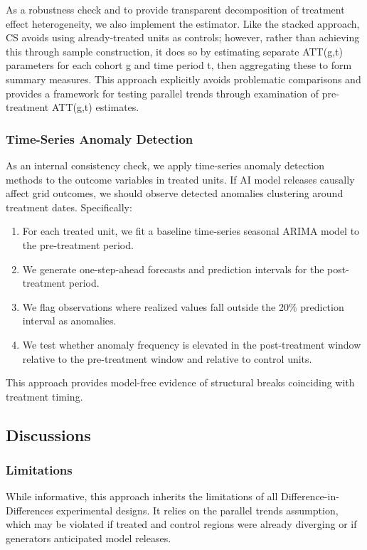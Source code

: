 \documentclass[a4paper,fleqn,longmktitle]{cas-sc}
\theoremstyle{plain}
\theoremstyle{definition}
\begin{document}
As a robustness check and to provide transparent decomposition of treatment effect heterogeneity, we also implement the \citet{callaway2021difference} estimator. Like the stacked approach, CS avoids using already-treated units as controls; however, rather than achieving this through sample construction, it does so by estimating separate ATT(g,t) parameters for each cohort g and time period t, then aggregating these to form summary measures. This approach explicitly avoids problematic comparisons and provides a framework for testing parallel trends through examination of pre-treatment ATT(g,t) estimates. 
\subsubsection{Time-Series Anomaly Detection}

As an internal consistency check, we apply time-series anomaly detection methods to the outcome variables in treated units. If AI model releases causally affect grid outcomes, we should observe detected anomalies clustering around treatment dates. Specifically:
\begin{enumerate}
    \item For each treated unit, we fit a baseline time-series seasonal ARIMA model to the pre-treatment period.
    \item We generate one-step-ahead forecasts and prediction intervals for the post-treatment period.
    \item We flag observations where realized values fall outside the 20\% prediction interval as anomalies.
    \item We test whether anomaly frequency is elevated in the post-treatment window relative to the pre-treatment window and relative to control units.
\end{enumerate}
This approach provides model-free evidence of structural breaks coinciding with treatment timing.

\subsection{Discussions}

\subsubsection{Limitations}

While informative, this approach inherits the limitations of all Difference-in-Differences experimental designs. It relies on the parallel trends assumption, which may be violated if treated and control regions were already diverging or if generators anticipated model releases.
\end{document}
